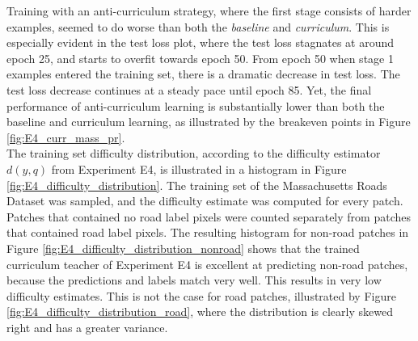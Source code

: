 Training with an anti-curriculum strategy, where the first stage consists of harder examples, seemed to do worse than both the \textit{baseline} and \textit{curriculum}. This is especially evident in the test loss plot, where the test loss stagnates at around epoch 25, and starts to overfit towards epoch 50. From epoch 50 when stage 1 examples entered the training set, there is a dramatic decrease in test loss. The test loss decrease continues at a steady pace until epoch 85. Yet, the final performance of anti-curriculum learning is substantially lower than both the baseline and curriculum learning, as illustrated by the breakeven points in Figure \ref{fig:E4_curr_mass_pr}.\\

The training set difficulty distribution, according to the difficulty estimator $d(y,q)$ from Experiment E4, is illustrated in a histogram in Figure \ref{fig:E4_difficulty_distribution}. The training set of the Massachusetts Roads Dataset was sampled, and the difficulty estimate was computed for every patch. Patches that contained no road label pixels were counted separately from patches that contained road label pixels. The resulting histogram for non-road patches in Figure \ref{fig:E4_difficulty_distribution_nonroad} shows that the trained curriculum teacher of Experiment E4 is excellent at predicting non-road patches, because the predictions and labels match very well. This results in very low difficulty estimates. This is not the case for road patches, illustrated by Figure  \ref{fig:E4_difficulty_distribution_road}, where the distribution is clearly skewed right and has a greater variance. \\

